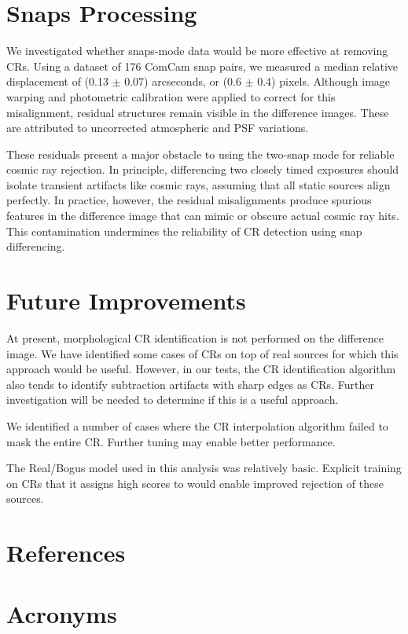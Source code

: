 \documentclass[DM,lsstdraft,authoryear,toc]{lsstdoc}
\begin{document}
\section{Snaps Processing}

We investigated whether snaps-mode data would be more effective at removing CRs.
Using a dataset of 176 ComCam snap pairs, we measured a median relative displacement of (0.13 $\pm$ 0.07) arcseconds, or (0.6 $\pm$ 0.4) pixels. 
Although image warping and photometric calibration were applied to correct
for this misalignment, residual structures remain visible in the difference images.  
These are attributed to uncorrected atmospheric and PSF variations.

These residuals present a major obstacle to using the two-snap mode for reliable cosmic ray rejection. 
In principle, differencing two closely timed exposures should isolate transient artifacts like cosmic rays, assuming that all static sources align perfectly. 
In practice, however, the residual misalignments produce spurious features in the difference image that can mimic or obscure actual cosmic ray hits. 
This contamination undermines the reliability of CR detection using snap differencing.


\section{Future Improvements}

At present, morphological CR identification is not performed on the difference image.
We have identified some cases of CRs on top of real sources for which this approach would be useful.  
However, in our tests, the CR identification algorithm also tends to identify subtraction artifacts with sharp edges as CRs.
Further investigation will be needed to determine if this is a useful approach.

We identified a number of cases where the CR interpolation algorithm failed to mask the entire CR.
Further tuning may enable better performance.

The Real/Bogus model used in this analysis was relatively basic.
Explicit training on CRs that it assigns high scores to would enable improved rejection of these sources.


\appendix
\section{References} \label{sec:bib}
\renewcommand{\refname}{} %


\section{Acronyms} \label{sec:acronyms}

\end{document}
